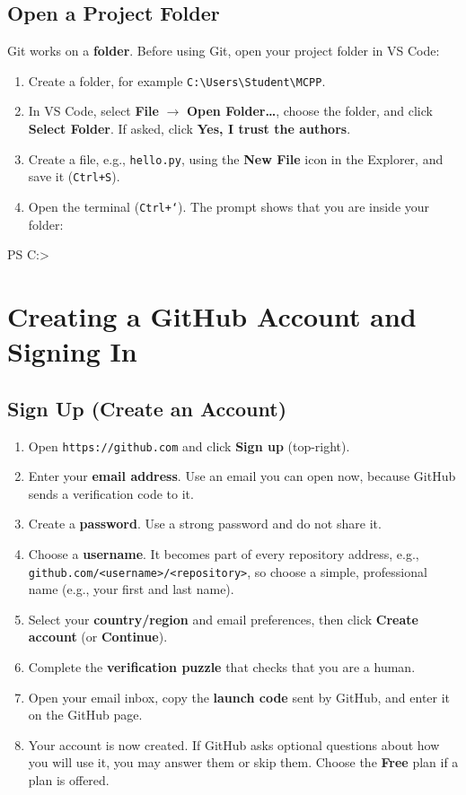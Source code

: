 \documentclass[11pt,a4paper]{article}
\newcommand{\code}[1]{\texttt{#1}}
\newcommand{\menu}[1]{\textsf{\textbf{#1}}}
\begin{document}
\subsection{Open a Project Folder}

Git works on a \textbf{folder}. Before using Git, open your project folder in VS Code:
\begin{enumerate}
\item Create a folder, for example \code{C:\textbackslash Users\textbackslash Student\textbackslash MCPP}.
\item In VS Code, select \menu{File} $\rightarrow$ \menu{Open Folder\ldots}, choose the folder, and click \menu{Select Folder}. If asked, click \menu{Yes, I trust the authors}.
\item Create a file, e.g., \code{hello.py}, using the \menu{New File} icon in the Explorer, and save it (\code{Ctrl+S}).
\item Open the terminal (\code{Ctrl+`}). The prompt shows that you are inside your folder:
\end{enumerate}
\begin{outbox}
PS C:\Users\Student\MCPP>
\end{outbox}

\section{Creating a GitHub Account and Signing In}
\label{sec:account}

\subsection{Sign Up (Create an Account)}

\begin{enumerate}
\item Open \code{https://github.com} and click \menu{Sign up} (top-right).
\item Enter your \textbf{email address}. Use an email you can open now, because GitHub sends a verification code to it.
\item Create a \textbf{password}. Use a strong password and do not share it.
\item Choose a \textbf{username}. It becomes part of every repository address, e.g., \code{github.com/\allowbreak<username>/\allowbreak<repository>}, so choose a simple, professional name (e.g., your first and last name).
\item Select your \textbf{country/region} and email preferences, then click \menu{Create account} (or \menu{Continue}).
\item Complete the \textbf{verification puzzle} that checks that you are a human.
\item Open your email inbox, copy the \textbf{launch code} sent by GitHub, and enter it on the GitHub page.
\item Your account is now created. If GitHub asks optional questions about how you will use it, you may answer them or skip them. Choose the \textbf{Free} plan if a plan is offered.
\end{enumerate}
\end{document}

